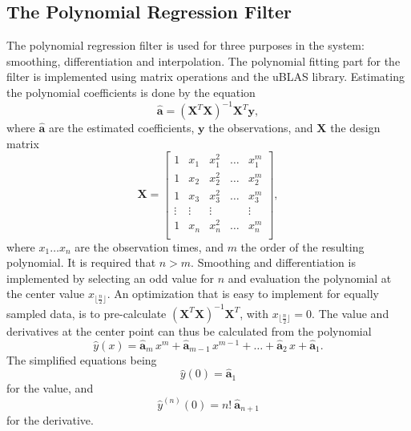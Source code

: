 \subsection{The Polynomial Regression Filter}

The polynomial regression filter is used for three purposes in the system:
smoothing, differentiation and interpolation.
The polynomial fitting part for the filter is implemented using
matrix operations and the uBLAS library.
Estimating the polynomial coefficients is done by the equation
\begin{equation}
\label{eq:sg_coefs}
\widehat{\mathbf{a}} = \left( \mathbf{X}^T \mathbf{X} \right)^{-1} \mathbf{X}^T \mathbf{y},
\end{equation}
where $\widehat{\mathbf{a}}$ are the estimated coefficients,
$\mathbf{y}$ the observations,
and $\mathbf{X}$ the design matrix
\begin{equation}
\label{eq:sg_design_matrix}
\mathbf{X} = \left[
\begin{array}{ccccc}
1 & x_1 & x_1^2 & \ldots & x_1^m \\
1 & x_2 & x_2^2 & \ldots & x_2^m \\
1 & x_3 & x_3^2 & \ldots & x_3^m \\
\vdots & \vdots & \vdots & & \vdots \\
1 & x_n & x_n^2 & \ldots & x_n^m \\
\end{array}
\right] ,
\end{equation}
where $x_1 \ldots x_n$ are the observation times,
and $m$ the order of the resulting polynomial.
It is required that $n > m$.
Smoothing and differentiation is implemented by
selecting an odd value for $n$
and evaluation the polynomial at the center value
$x_{\lfloor \frac{n}{2} \rfloor}$.
An optimization that is easy to implement for equally sampled data,
is to pre-calculate $\left( \mathbf{X}^T \mathbf{X} \right)^{-1} \mathbf{X}^T$,
with $x_{\lfloor \frac{n}{2} \rfloor} = 0$.
The value and derivatives at the center point
can thus be calculated from the polynomial
\begin{equation}
\widehat{y}(x) =
\widehat{\mathbf{a}}_m \, x^m +
\widehat{\mathbf{a}}_{m-1} \, x^{m-1} +
\ldots +
\widehat{\mathbf{a}}_{2} \, x +
\widehat{\mathbf{a}}_{1}.
\end{equation}
The simplified equations being
\begin{equation}
\widehat{y}(0) = \widehat{\mathbf{a}}_{1}
\end{equation}
for the value, and
\begin{equation}
\widehat{y}^{(n)}(0) = n! \: \widehat{\mathbf{a}}_{n + 1}
\end{equation}
for the \nth derivative.

